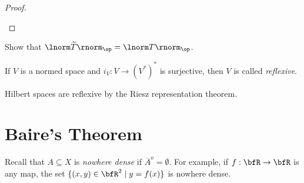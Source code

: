 \begin{proof}
\begin{center}
                \end{center}
            
        \end{proof}

    \begin{exercise}
        Show that $\lnorm \widetilde{T} \rnorm_{\op} = \lnorm T \rnorm_{\op}$.
    \end{exercise}

    \begin{definition}
        If $V$ is a normed space and $i_V:V \rightarrow \left( V^\ast \right)^\ast$ is surjective, then $V$ is called \textit{reflexive}.
    \end{definition}

    \begin{example}
        Hilbert spaces are reflexive by the Riesz representation theorem.
    \end{example}

\section{Baire's Theorem}

Recall that $A \subseteq X$ is \textit{nowhere dense} if $\overline{A}^o = \emptyset$. For example, if $f:\bfR \rightarrow \bfR$ is any map, the set $\{(x,y) \in \bfR^2 \mid y = f(x)\}$ is nowhere dense.

